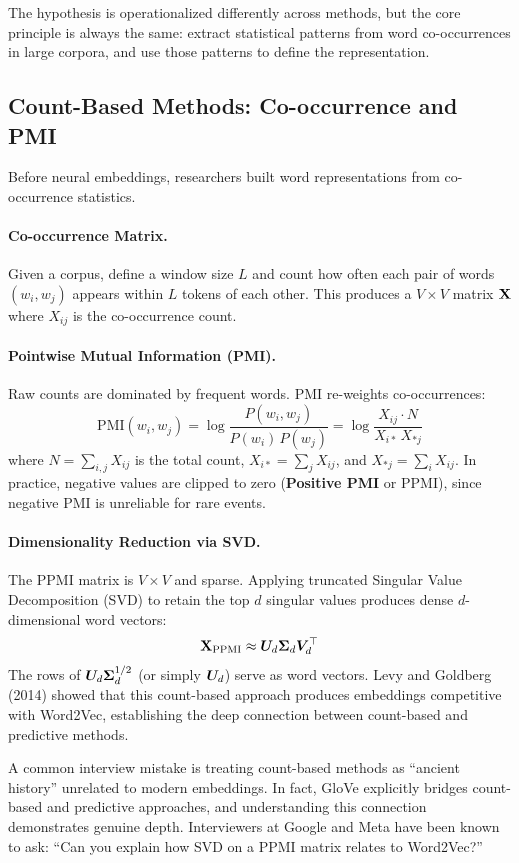 The hypothesis is operationalized differently across methods, but the core
principle is always the same: extract statistical patterns from word
co-occurrences in large corpora, and use those patterns to define the
representation.

\subsection{Count-Based Methods: Co-occurrence and PMI}

Before neural embeddings, researchers built word representations from
co-occurrence statistics.

\paragraph{Co-occurrence Matrix.}
Given a corpus, define a window size $L$ and count how often each pair of words
$(w_i, w_j)$ appears within $L$ tokens of each other.  This produces a
$V \times V$ matrix $\mathbf{X}$ where $X_{ij}$ is the co-occurrence count.

\paragraph{Pointwise Mutual Information (PMI).}
Raw counts are dominated by frequent words.  PMI re-weights co-occurrences:
\[
    \text{PMI}(w_i, w_j)
    = \log \frac{P(w_i, w_j)}{P(w_i)\, P(w_j)}
    = \log \frac{X_{ij} \cdot N}{X_{i*}\, X_{*j}}
\]
where $N = \sum_{i,j} X_{ij}$ is the total count, $X_{i*} = \sum_j X_{ij}$,
and $X_{*j} = \sum_i X_{ij}$.  In practice, negative values are clipped to
zero (\textbf{Positive PMI} or PPMI), since negative PMI is unreliable for
rare events.

\paragraph{Dimensionality Reduction via SVD.}
The PPMI matrix is $V \times V$ and sparse.  Applying truncated Singular Value
Decomposition (SVD) to retain the top $d$ singular values produces dense
$d$-dimensional word vectors:
\[
    \mathbf{X}_{\text{PPMI}} \approx \bm{U}_d \bm{\Sigma}_d \bm{V}_d^\top
\]
The rows of $\bm{U}_d \bm{\Sigma}_d^{1/2}$ (or simply $\bm{U}_d$) serve as word
vectors.  Levy and Goldberg (2014) showed that this count-based approach
produces embeddings competitive with Word2Vec, establishing the deep connection
between count-based and predictive methods.

\begin{warningbox}
A common interview mistake is treating count-based methods as ``ancient
history'' unrelated to modern embeddings.  In fact, GloVe explicitly bridges
count-based and predictive approaches, and understanding this connection
demonstrates genuine depth.  Interviewers at Google and Meta have been known
to ask: ``Can you explain how SVD on a PPMI matrix relates to Word2Vec?''
\end{warningbox}


